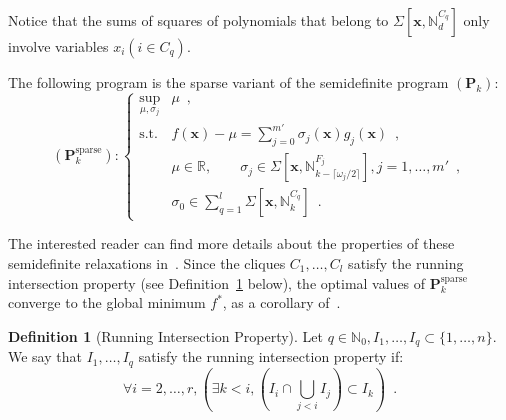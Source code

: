\documentclass[a4paper,10pt]{article}
\newcommand{\mons}[2]{\N_{#1}^{#2}}
\newcommand{\R}{\mathbb{R}}
\newcommand{\N}{\mathbb{N}}
\newcommand{\x}{\mathbf{x}}
\def\P{\mathbf{P}}
\theoremstyle{plain}
\theoremstyle{definition}
\newtheorem{definition}[theorem]{Definition}
\theoremstyle{remark}
\begin{document}
Notice that the sums of squares of polynomials that belong to $\Sigma [\x, \mons{d}{C_q}]$ only involve variables $x_i (i \in C_q)$. 

The following program is the sparse variant of the semidefinite program $(\P_k)$:
\[
(\P^{\text{sparse}}_k):\left\{			
\begin{array}{ll}
\sup_{\mu, \sigma_j} & \mu\enspace, \\			 
\text{s.t.} & f (\x) - \mu = \sum\limits_{j = 0}^{m'} \sigma_j(\x) g_j(\x)\enspace, \\
& \mu\in \R,\qquad \sigma_j \in \Sigma[\x, \mons{k - \lceil \omega_j / 2 \rceil }{F_j}], j = 1,\dots,m' \enspace,\\
& \sigma_0 \in \sum\limits_{q = 1}^l \Sigma [\x, \mons{k}{C_q}]\enspace.
\end{array} \right.
\]

The interested reader can find more details about the properties of these semidefinite relaxations in~\cite{Waki06SparseSOS}. Since the cliques $C_1, \dots, C_l$ satisfy the running intersection property (see Definition~\ref{def:rip} below), the optimal values of $\P_k^{\text{sparse}}$ converge to the global minimum $f^*$, as a corollary of~\cite[Theorem 3.6]{Las06SparseSOS}.

\begin{definition}[Running Intersection Property]
\label{def:rip}
Let $q \in \N_0, I_1, \dots, I_q \subset \{1, \dots, n\}$. We say that $I_1, \dots, I_q$ satisfy the running intersection property if: 
\[ \forall i = 2, \dots, r, (\exists k < i, (I_i \cap \bigcup\limits_{j < i} I_j) \subset I_k)\enspace. \]
\end{definition}
\end{document}
